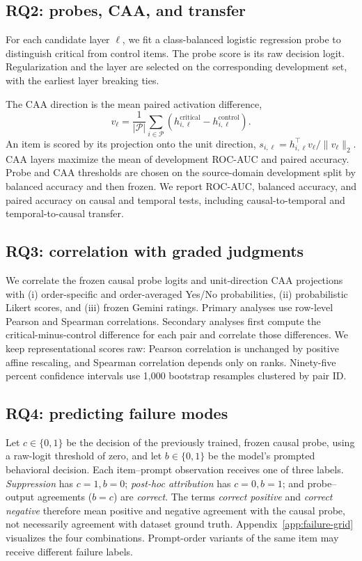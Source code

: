 \subsection{RQ2: probes, CAA, and transfer}
For each candidate layer $\ell$, we fit a class-balanced logistic regression probe to distinguish critical from control items. The probe score is its raw decision logit. Regularization and the layer are selected on the corresponding development set, with the earliest layer breaking ties.

The CAA direction is the mean paired activation difference,
\begin{equation}
 v_\ell = \frac{1}{|\mathcal P|}\sum_{i\in\mathcal P}
 \left(h_{i,\ell}^{\mathrm{critical}}-h_{i,\ell}^{\mathrm{control}}\right).
\end{equation}
An item is scored by its projection onto the unit direction,
$s_{i,\ell}=h_{i,\ell}^{\top}v_\ell/\lVert v_\ell\rVert_2$.
CAA layers maximize the mean of development ROC-AUC and paired accuracy. Probe and CAA thresholds are chosen on the source-domain development split by balanced accuracy and then frozen. We report ROC-AUC, balanced accuracy, and paired accuracy on causal and temporal tests, including causal-to-temporal and temporal-to-causal transfer.

\subsection{RQ3: correlation with graded judgments}
We correlate the frozen causal probe logits and unit-direction CAA projections with (i) order-specific and order-averaged Yes/No probabilities, (ii) probabilistic Likert scores, and (iii) frozen Gemini ratings. Primary analyses use row-level Pearson and Spearman correlations. Secondary analyses first compute the critical-minus-control difference for each pair and correlate those differences. We keep representational scores raw: Pearson correlation is unchanged by positive affine rescaling, and Spearman correlation depends only on ranks. Ninety-five percent confidence intervals use 1,000 bootstrap resamples clustered by pair ID.

\subsection{RQ4: predicting failure modes}
Let $c\in\{0,1\}$ be the decision of the previously trained, frozen causal probe, using a raw-logit threshold of zero, and let $b\in\{0,1\}$ be the model's prompted behavioral decision. Each item--prompt observation receives one of three labels. \emph{Suppression} has $c=1,b=0$; \emph{post-hoc attribution} has $c=0,b=1$; and probe--output agreements ($b=c$) are \emph{correct}. The terms \emph{correct positive} and \emph{correct negative} therefore mean positive and negative agreement with the causal probe, not necessarily agreement with dataset ground truth. Appendix~\ref{app:failure-grid} visualizes the four combinations. Prompt-order variants of the same item may receive different failure labels.


